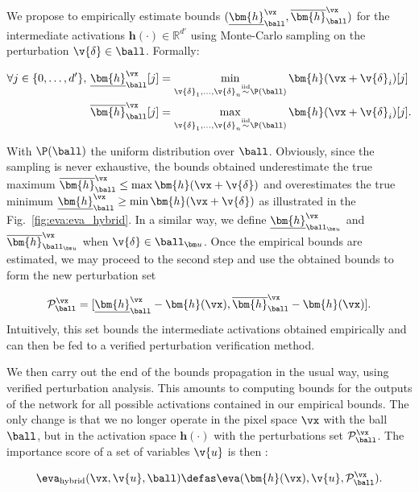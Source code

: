 We propose to empirically estimate bounds 
$( \underline{\bm{h}}_{\ball}^{\vx}, \overline{\bm{h}}_{\ball}^{\vx} )$ for the intermediate activations $ \bm{h}(\cdot) \in \mathbb{R}^{d'}$ using Monte-Carlo sampling on the perturbation $\v{\delta} \in \ball$. Formally:

\begin{equation*}
\begin{split}
    \forall j \in \{0, \ldots, d'\}, ~
& \underline{\bm{h}}_{\ball}^{\vx}[j] = 
  \min\limits_{\v{\delta}_1,\ldots, \v{\delta}_n \overset{\text{iid}}{\sim} \P(\ball)}
  \bm{h}(\vx+\v{\delta}_i)[j]\\
& \overline{\bm{h}}_{\ball}^{\vx}[j] =  
  \max\limits_{\v{\delta}_1,\ldots,\v{\delta}_n  \overset{\text{iid}}{\sim} \P(\ball)}
  \bm{h}(\vx+\v{\delta}_i)[j].
\end{split}
\end{equation*}

With $\P(\ball)$ the uniform distribution over $\ball$. Obviously, since the sampling is never exhaustive, the bounds obtained underestimate the true maximum $ \overline{\bm{h}}_{\ball}^{\vx} \leq \max \bm{h}(\vx + \v{\delta})$ and overestimates the true minimum $ \underline{\bm{h}}_{\ball}^{\vx} \geq \min \bm{h}(\vx + \v{\delta})$ as illustrated in the Fig.~\ref{fig:eva:eva_hybrid}.
In a similar way, we define $\underline{\bm{h}}_{\ballu}^{\vx}$ and $\overline{\bm{h}}_{\ballu}^{\vx}$ when  $\v{\delta} \in \ballu$. 
Once the empirical bounds are estimated, we may proceed to the second step and use the obtained bounds to form the new perturbation set 

$$ 
\mathcal{P}^{\vx}_{\ball} = 
    [\underline{\bm{h}}_{\ball}^{\vx} - \bm{h}(\vx), 
    \overline{\bm{h}}_{\ball}^{\vx} - \bm{h}(\vx)].
$$ 
Intuitively, this set bounds the intermediate activations obtained empirically and can then be fed to a verified perturbation verification method.



We then carry out the end of the bounds propagation in the usual way, using verified perturbation analysis. This amounts to computing bounds for the outputs of the network for all possible activations contained in our empirical bounds. The only change is that we no longer operate in the pixel space $\vx$ with the ball $\ball$, but in the activation space $\bm{h}(\cdot)$  with the perturbations set $\mathcal{P}^{\vx}_{\ball}$. The importance score of a set of variables $\v{u}$ is then : 

$$ \evaH(\vx, \v{u}, \ball) \defas \eva(\bm{h}(\vx), \v{u}, \mathcal{P}^{\vx}_{\ball}).$$


